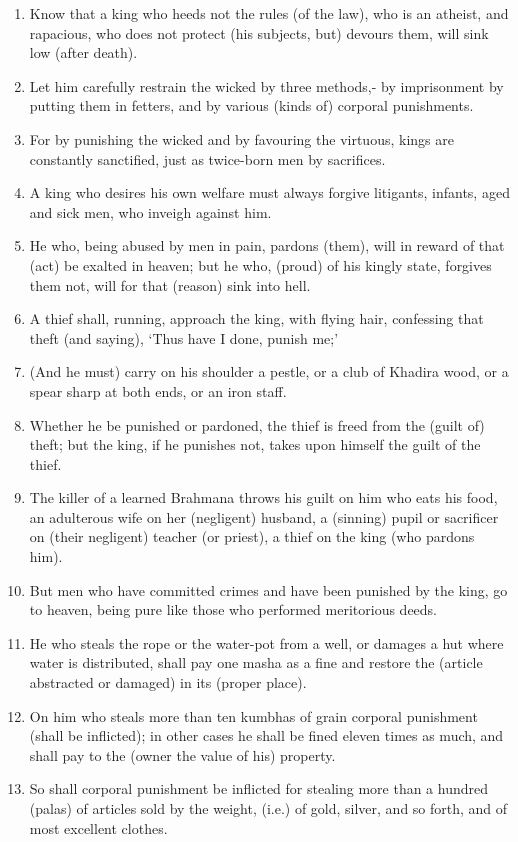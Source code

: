 \begin{enumerate}
\item Know that a king who heeds not the rules (of the law), who is an atheist, and rapacious, who does not protect (his subjects, but) devours them, will sink low (after death).
\item Let him carefully restrain the wicked by three methods,- by imprisonment by putting them in fetters, and by various (kinds of) corporal punishments.
\item For by punishing the wicked and by favouring the virtuous, kings are constantly sanctified, just as twice-born men by sacrifices.
\item A king who desires his own welfare must always forgive litigants, infants, aged and sick men, who inveigh against him.
\item He who, being abused by men in pain, pardons (them), will in reward of that (act) be exalted in heaven; but he who, (proud) of his kingly state, forgives them not, will for that (reason) sink into hell.
\item A thief shall, running, approach the king, with flying hair, confessing that theft (and saying), `Thus have I done, punish me;'
\item (And he must) carry on his shoulder a pestle, or a club of Khadira wood, or a spear sharp at both ends, or an iron staff.
\item Whether he be punished or pardoned, the thief is freed from the (guilt of) theft; but the king, if he punishes not, takes upon himself the guilt of the thief.
\item The killer of a learned Brahmana throws his guilt on him who eats his food, an adulterous wife on her (negligent) husband, a (sinning) pupil or sacrificer on (their negligent) teacher (or priest), a thief on the king (who pardons him).
\item But men who have committed crimes and have been punished by the king, go to heaven, being pure like those who performed meritorious deeds.
\item He who steals the rope or the water-pot from a well, or damages a hut where water is distributed, shall pay one masha as a fine and restore the (article abstracted or damaged) in its (proper place).
\item On him who steals more than ten kumbhas of grain corporal punishment (shall be inflicted); in other cases he shall be fined eleven times as much, and shall pay to the (owner the value of his) property.
\item So shall corporal punishment be inflicted for stealing more than a hundred (palas) of articles sold by the weight, (i.e.) of gold, silver, and so forth, and of most excellent clothes.

\end{enumerate}
